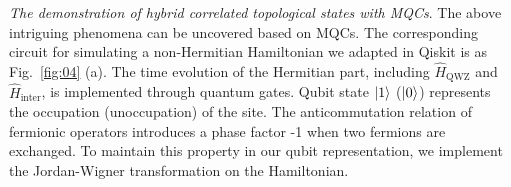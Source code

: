 \documentclass[longbibliography, aps, prx, amsmath, amssymb, amsfonts, twocolumn,superscriptaddress, footinbib]{revtex4-1}
\begin{document}
	\textit{The demonstration of hybrid correlated topological states with MQCs}.
	The above intriguing phenomena can be uncovered based on MQCs. The corresponding circuit for simulating a non-Hermitian Hamiltonian we adapted in Qiskit is as Fig.~\ref{fig:04} (a). The time evolution of the Hermitian part, including $\hat{H}_{\text{QWZ}}$ and $\hat{H}_{\text{inter}}$, is implemented through quantum gates. 
	Qubit state $\ket{1}$ ($\ket{0}$) represents the occupation (unoccupation) of the site. 
	The anticommutation relation of fermionic operators introduces a phase factor -1 when two fermions are exchanged. To maintain this property in our qubit representation, we implement the Jordan-Wigner transformation on the Hamiltonian.
\end{document}

